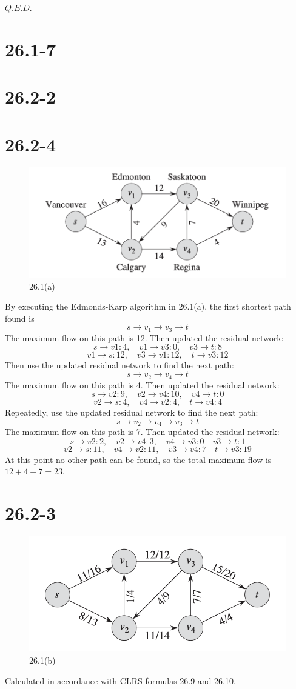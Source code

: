 \documentclass[12pt]{article}
\begin{document}
$Q.E.D.$

\section{26.1-7}

\section{26.2-2}
\section{26.2-4}
\begin{figure}[h]
    \centering
    \includegraphics[width=0.5\linewidth]{截屏2024-11-18 下午8.43.56.png}
    \caption{26.1(a)}
    \label{fig:26.1(a)}
\end{figure}
By executing the Edmonds-Karp algorithm in 26.1(a), the first shortest path found is 
\[s \rightarrow v_1 \rightarrow v_3 \rightarrow t\]
The maximum flow on this path is 12.
Then updated the residual network:
\[s \rightarrow v1: 4, \quad v1 \rightarrow v3: 0, \quad v3 \rightarrow t: 8\]
\[v1 \rightarrow s: 12, \quad v3 \rightarrow v1: 12, \quad t \rightarrow v3: 12\]
Then use the updated residual network to find the next path:
\[s  \rightarrow v_2 \rightarrow v_4 \rightarrow t\]
The maximum flow on this path is 4.
Then updated the residual network:
\[s \rightarrow v2: 9, \quad v2 \rightarrow v4: 10, \quad v4 \rightarrow t: 0 \]
\[v2 \rightarrow s: 4, \quad v4 \rightarrow v2: 4, \quad t \rightarrow v4: 4 \]
Repeatedly, use the updated residual network to find the next path:
\[s \rightarrow v_2 \rightarrow v_4  \rightarrow v_3 \rightarrow t\]
The maximum flow on this path is 7.
Then updated the residual network:
\[s \rightarrow v2: 2, \quad v2 \rightarrow v4: 3, \quad v4 \rightarrow v3: 0 \quad v3 \rightarrow t: 1\]
\[v2 \rightarrow s: 11, \quad v4 \rightarrow v2: 11, \quad v3 \rightarrow v4: 7 \quad t \rightarrow v3: 19\]
At this point no other path can be found, so the total maximum flow is \(12+4+7=23\).
\section{26.2-3}
\begin{figure}[h]
    \centering
    \includegraphics[width=0.5\linewidth]{截屏2024-11-18 下午8.46.37.png}
    \caption{26.1(b)}
    \label{fig:enter-label}

\end{figure}
Calculated in accordance with CLRS formulas 26.9 and 26.10.
\end{document}
